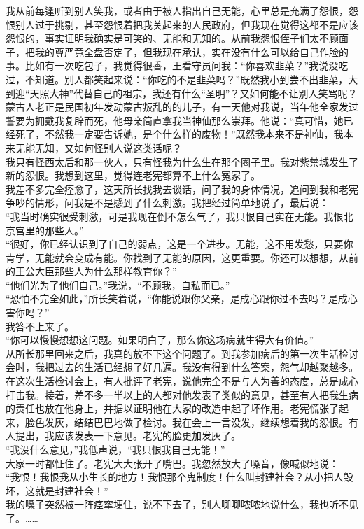 我从前每逢听到别人笑我，或者由于被人指出自己无能，心里总是充满了怨恨，怨恨别人过于挑剔，甚至怨恨着把我关起来的人民政府，但我现在觉得这都不是应该怨恨的，事实证明我确实是可笑的、无能和无知的。从前我怨恨侄子们太不顾面子，把我的尊严竟全盘否定了，但我现在承认，实在没有什么可以给自己作脸的事。比如有一次吃包子，我觉得很香，王看守员问我：“你喜欢韭菜？”我说没吃过，不知道。别人都笑起来说：“你吃的不是韭菜吗？”既然我小到尝不出韭菜，大到迎“天照大神”代替自己的祖宗，我还有什么“圣明”？又如何能不让别人笑骂呢？蒙古人老正是民国初年发动蒙古叛乱的的儿子，有一天他对我说，当年他全家发过誓要为拥戴我复辟而死，他母亲简直拿我当神仙那么崇拜。他说：“真可惜，她已经死了，不然我一定要告诉她，是个什么样的废物！”既然我本来不是神仙，我本来无能无知，又如何怪别人说这类话呢？\\

我只有怪西太后和那一伙人，只有怪我为什么生在那个圈子里。我对紫禁城发生了新的怨恨。我想到这里，觉得连老宪都算不上什么冤家了。\\

我差不多完全痊愈了，这天所长找我去谈话，问了我的身体情况，追问到我和老宪争吵的情形，问我是不是感到了什么刺激。我把经过简单地说了，最后说：\\

“我当时确实很受刺激，可是我现在倒不怎么气了，我只恨自己实在无能。我恨北京宫里的那些人。”\\

“很好，你已经认识到了自己的弱点，这是一个进步。无能，这不用发愁，只要你肯学，无能就会变成有能。你找到了无能的原因，这更重要。你还可以想想，从前的王公大臣那些人为什么那样教育你？”\\

“他们光为了他们自己。”我说，“不顾我，自私而已。”\\

“恐怕不完全如此，”所长笑着说，“你能说跟你父亲，是成心跟你过不去吗？是成心害你吗？”\\

我答不上来了。\\

“你可以慢慢想想这问题。如果明白了，那么你这场病就生得大有价值。”\\

从所长那里回来之后，我真的放不下这个问题了。到我参加病后的第一次生活检讨会时，我把过去的生活已经想了好几遍。我没有得到什么答案，怨气却越聚越多。\\

在这次生活检讨会上，有人批评了老宪，说他完全不是与人为善的态度，总是成心打击我。接着，差不多一半以上的人都对他发表了类似的意见，甚至有人把我生病的责任也放在他身上，并据以证明他在大家的改造中起了坏作用。老宪慌张了起来，脸色发灰，结结巴巴地做了检讨。我在会上一言没发，继续想着我的怨恨。有人提出，我应该发表一下意见。老宪的脸更加发灰了。\\

“我没什么意见，”我低声说，“我只恨我自己无能！”\\

大家一时都怔住了。老宪大大张开了嘴巴。我忽然放大了嗓音，像喊似地说：\\

“我恨！我恨我从小生长的地方！我恨那个鬼制度！什么叫封建社会？从小把人毁坏，这就是封建社会！”\\

我的嗓子突然被一阵痉挛埂住，说不下去了，别人唧唧哝哝地说什么，我也听不见了。……
